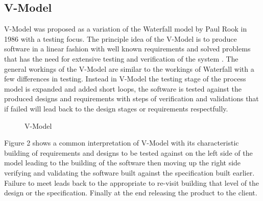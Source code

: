 \documentclass{style/CRPITStyle}
\renewcommand{\cite}{\citep}
\begin{document}
\subsection{V-Model} %

V-Model was proposed as a variation of the Waterfall model by Paul Rook in 1986
\cite{rook:1986:vmodel} with a testing focus.
The principle idea of the V-Model is to produce software in a linear fashion with
well known requirements and solved problems that has the need for extensive testing 
and verification of the system \cite{rook:1986:vmodel}.
The general workings of the V-Model are similar to the workings of Waterfall
with a few differences in testing.
Instead in V-Model the testing stage of the process model is expanded and added short loops,
the software is tested against the produced designs and requirements with
steps of verification and validations  that if failed will lead back to the design
stages or requirements respectfully.

\vspace{.1in}

\begin{figure}[htb]
\caption{\protect\label{vmodel}  V-Model}
\end{figure}

\vspace{.1in}

Figure 2 shows a common interpretation of V-Model with its characteristic
building of requirements and designs to be tested against on the left side of
the model leading to the building of the software then moving up the right side
verifying and validating the software built against the specification built
earlier. Failure to meet leads back to the appropriate to re-visit building that
level of the design or the specification. Finally at the end releasing the
product to the client.
\end{document}
